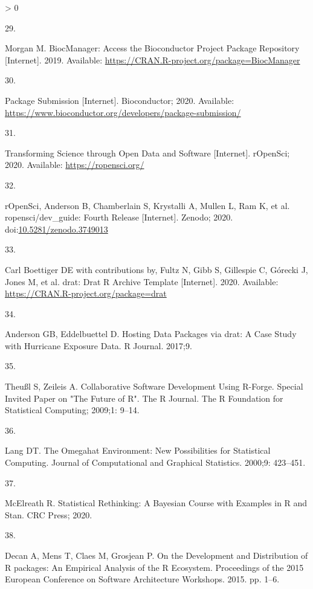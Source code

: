 \documentclass[10pt,letterpaper]{article}
\newlength{\csllabelwidth}
\newlength{\cslhangindent}
\newenvironment{CSLReferences}[3] %
 {%
  \setlength{\parindent}{0pt}
  \ifodd #1 \everypar{\setlength{\hangindent}{\cslhangindent}}\ignorespaces\fi
  \ifnum #2 > 0
  \setlength{\parskip}{#2\baselineskip}
  \fi
 }%
 {}
\newcommand{\CSLLeftMargin}[1]{\parbox[t]{\csllabelwidth}{#1}}
\newcommand{\CSLRightInline}[1]{\parbox[t]{\linewidth - \csllabelwidth}{#1}}
\begin{document}
\begin{CSLReferences}{0}{0}
\leavevmode\hypertarget{ref-BiocManager}{}%
\CSLLeftMargin{29. }
\CSLRightInline{Morgan M. {BiocManager: Access the Bioconductor Project
Package Repository} {[}Internet{]}. 2019. Available:
\url{https://CRAN.R-project.org/package=BiocManager}}

\leavevmode\hypertarget{ref-biocpkgsub2020}{}%
\CSLLeftMargin{30. }
\CSLRightInline{{Package Submission} {[}Internet{]}. Bioconductor; 2020.
Available:
\url{https://www.bioconductor.org/developers/package-submission/}}

\leavevmode\hypertarget{ref-ropensci2020}{}%
\CSLLeftMargin{31. }
\CSLRightInline{{Transforming Science through Open Data and Software}
{[}Internet{]}. rOpenSci; 2020. Available: \url{https://ropensci.org/}}

\leavevmode\hypertarget{ref-ropenscidev2020}{}%
\CSLLeftMargin{32. }
\CSLRightInline{rOpenSci, Anderson B, Chamberlain S, Krystalli A, Mullen
L, Ram K, et al. {ropensci/dev\_guide: Fourth Release} {[}Internet{]}.
Zenodo; 2020.
doi:\href{https://doi.org/10.5281/zenodo.3749013}{10.5281/zenodo.3749013}}

\leavevmode\hypertarget{ref-drat}{}%
\CSLLeftMargin{33. }
\CSLRightInline{Carl Boettiger DE with contributions by, Fultz N, Gibb
S, Gillespie C, Górecki J, Jones M, et al. {drat: Drat R Archive
Template} {[}Internet{]}. 2020. Available:
\url{https://CRAN.R-project.org/package=drat}}

\leavevmode\hypertarget{ref-anderson2017}{}%
\CSLLeftMargin{34. }
\CSLRightInline{Anderson GB, Eddelbuettel D. {Hosting Data Packages via
drat: A Case Study with Hurricane Exposure Data}. R Journal. 2017;9. }

\leavevmode\hypertarget{ref-theussl2009}{}%
\CSLLeftMargin{35. }
\CSLRightInline{Theußl S, Zeileis A. {Collaborative Software Development
Using R-Forge. Special Invited Paper on "The Future of R"}. The R
Journal. The R Foundation for Statistical Computing; 2009;1: 9--14. }

\leavevmode\hypertarget{ref-lang2000}{}%
\CSLLeftMargin{36. }
\CSLRightInline{Lang DT. {The Omegahat Environment: New Possibilities
for Statistical Computing}. Journal of Computational and Graphical
Statistics. 2000;9: 423--451. }

\leavevmode\hypertarget{ref-mcelreath2020}{}%
\CSLLeftMargin{37. }
\CSLRightInline{McElreath R. {Statistical Rethinking: A Bayesian Course
with Examples in R and Stan}. CRC Press; 2020. }

\leavevmode\hypertarget{ref-decan2015}{}%
\CSLLeftMargin{38. }
\CSLRightInline{Decan A, Mens T, Claes M, Grosjean P. {On the
Development and Distribution of R packages: An Empirical Analysis of the
R Ecosystem}. {Proceedings of the 2015 European Conference on Software
Architecture Workshops}. 2015. pp. 1--6. }


\end{CSLReferences}
\end{document}
